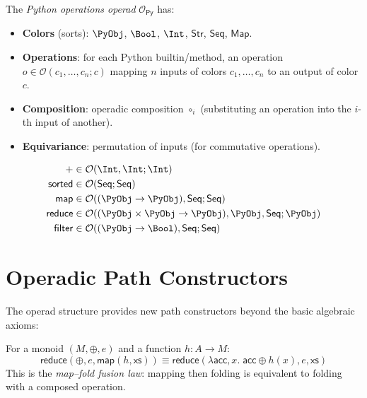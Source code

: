 \begin{definition}
The \emph{Python operations operad} $\mathcal{O}_\mathsf{Py}$ has:
\begin{itemize}
  \item \textbf{Colors} (sorts): $\PyObj$, $\Bool$, $\Int$,
    $\mathsf{Str}$, $\mathsf{Seq}$, $\mathsf{Map}$.
  \item \textbf{Operations}: for each Python builtin/method, an
    operation $o \in \mathcal{O}(c_1, \ldots, c_n; c)$ mapping
    $n$ inputs of colors $c_1, \ldots, c_n$ to an output of color $c$.
  \item \textbf{Composition}: operadic composition $\circ_i$
    (substituting an operation into the $i$-th input of another).
  \item \textbf{Equivariance}: permutation of inputs (for
    commutative operations).
\end{itemize}
\end{definition}

\begin{example}
\begin{align}
  + &\in \mathcal{O}(\Int, \Int; \Int) \\
  \mathsf{sorted} &\in \mathcal{O}(\mathsf{Seq}; \mathsf{Seq}) \\
  \mathsf{map} &\in \mathcal{O}((\PyObj \to \PyObj), \mathsf{Seq};
    \mathsf{Seq}) \\
  \mathsf{reduce} &\in \mathcal{O}((\PyObj \times \PyObj \to \PyObj),
    \PyObj, \mathsf{Seq}; \PyObj) \\
  \mathsf{filter} &\in \mathcal{O}((\PyObj \to \Bool), \mathsf{Seq};
    \mathsf{Seq})
\end{align}
\end{example}

\section{Operadic Path Constructors}

The operad structure provides new path constructors beyond the
basic algebraic axioms:

\begin{theorem}
\label{thm:map-fold}
For a monoid $(M, \oplus, e)$ and a function $h : A \to M$:
\[
  \mathsf{reduce}(\oplus, e, \mathsf{map}(h, \mathsf{xs}))
  \equiv
  \mathsf{reduce}(\lambda \mathsf{acc}, x.\; \mathsf{acc} \oplus h(x),
    e, \mathsf{xs})
\]
This is the \emph{map--fold fusion law}: mapping then folding is
equivalent to folding with a composed operation.
\end{theorem}

